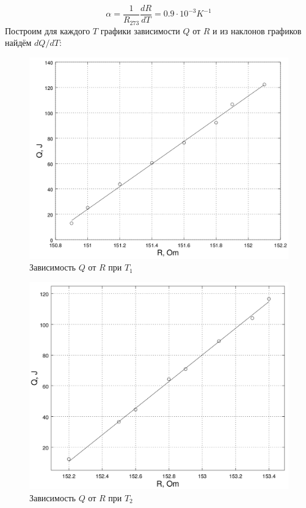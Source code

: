 \documentclass[20pt]{article}
\begin{document}
\[
	\alpha = \frac{1}{R_{273}} \frac{dR}{dT} = 0.9 \cdot 10^{-3} K^{-1}
\]
Построим для каждого $T$ графики зависимости $Q$ от $R$ и из наклонов графиков найдём $dQ/dT$:
\begin{figure}[H]
	\centering
	\caption{Зависимость $Q$ от $R$ при $T_1$}
	\includegraphics[scale=0.25]{t1.png}
\end{figure}
\begin{figure}[H]
	\centering
	\caption{Зависимость $Q$ от $R$ при $T_2$}
	\includegraphics[scale=0.25]{t2.png}
\end{figure}
\end{document}
